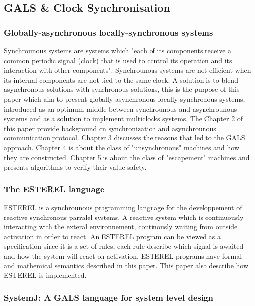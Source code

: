 \subsection{GALS \& Clock Synchronisation}

\subsubsection{Globally-asynchronous locally-synchronous systems}

Synchrounous systems are systems which "each of its components receive a common periodic signal (clock) that is used to control its operation and its interaction with other components". Synchrounous systems are not efficient when its internal components are not tied to the same clock. A solution is to blend asynchronous solutions with synchronous solutions, this is the purpose of this paper which aim to present globally-asynchronous locally-synchronous systems, introduced  as an optimum middle between synchrounous and asynchrounous systems and as a solution to implement multiclocks systems. The Chapter 2 of this paper provide background on synchronization and asynchrounous communication protocol. Chapter 3 discusses the reasons that led to the GALS approach. Chapter 4 is about the class of "unsynchronous" machines and how they are constructed. Chapter 5 is about the class of "escapement" machines and presents algorithms to verify their value-safety.


\subsubsection{The ESTEREL language}

ESTEREL is a synchrounous programming language for the developpement of reactive synchronous parralel systems. A reactive system which is continuously interacting with the exteral environnement, continously waiting from outside activation in order to react. An ESTEREL program can be viewed as a specification since it is a set of rules, each rule describe which signal is awaited and how the system will react on activation. ESTEREL programs have formal and mathemical semantics described in this paper. This paper also describe how ESTEREL is implemented.


\subsubsection{SystemJ: A GALS language for system level design}

